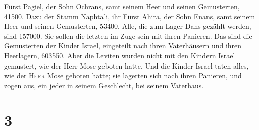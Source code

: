 Fürst Pagiel, der Sohn Ochrans,  samt seinem Heer und
seinen Gemusterten, 41500.  Dazu der Stamm Naphtali, ihr
Fürst Ahira, der Sohn Enans,  samt seinem Heer und seinen
Gemusterten, 53400.  Alle, die zum Lager Dans gezählt
werden, sind 157000. Sie sollen die letzten im Zuge sein mit ihren
Panieren.  Das sind die Gemusterten der Kinder Israel,
eingeteilt nach ihren Vaterhäusern und ihren Heerlagern, 603550.
 Aber die Leviten wurden nicht mit den Kindern Israel
gemustert, wie der Herr Mose geboten hatte.  Und die
Kinder Israel taten alles, wie der \textsc{Herr} Mose geboten hatte; sie
lagerten sich nach ihren Panieren, und zogen aus, ein jeder in seinem
Geschlecht, bei seinem Vaterhaus.

\hypertarget{section-2}{%
\section{3}\label{section-2}}

